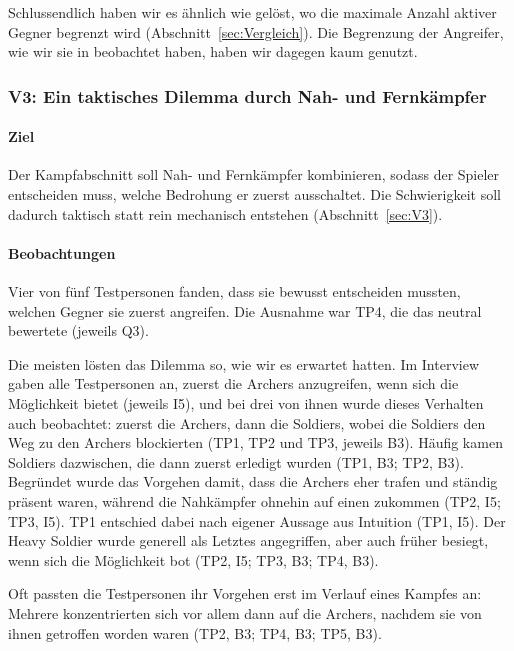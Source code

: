 \documentclass[../Main.tex]{subfiles}
\begin{document}
Schlussendlich haben wir es ähnlich wie  gelöst, wo die maximale Anzahl aktiver Gegner begrenzt wird (Abschnitt~\ref{sec:Vergleich}). Die Begrenzung der Angreifer, wie wir sie in  beobachtet haben, haben wir dagegen kaum genutzt.

\subsubsection{V3: Ein taktisches Dilemma durch Nah- und Fernkämpfer}

\paragraph{Ziel}
Der Kampfabschnitt soll Nah- und Fernkämpfer kombinieren, sodass der Spieler entscheiden muss, welche Bedrohung er zuerst ausschaltet. Die Schwierigkeit soll dadurch taktisch statt rein mechanisch entstehen (Abschnitt~\ref{sec:V3}).

\paragraph{Beobachtungen}
Vier von fünf Testpersonen fanden, dass sie bewusst entscheiden mussten, welchen Gegner sie zuerst angreifen. Die Ausnahme war TP4, die das neutral bewertete (jeweils Q3).

Die meisten lösten das Dilemma so, wie wir es erwartet hatten. Im Interview gaben alle Testpersonen an, zuerst die Archers anzugreifen, wenn sich die Möglichkeit bietet (jeweils I5), und bei drei von ihnen wurde dieses Verhalten auch beobachtet: zuerst die Archers, dann die Soldiers, wobei die Soldiers den Weg zu den Archers blockierten (TP1, TP2 und TP3, jeweils B3). Häufig kamen Soldiers dazwischen, die dann zuerst erledigt wurden (TP1, B3; TP2, B3). Begründet wurde das Vorgehen damit, dass die Archers eher trafen und ständig präsent waren, während die Nahkämpfer ohnehin auf einen zukommen (TP2, I5; TP3, I5). TP1 entschied dabei nach eigener Aussage aus Intuition (TP1, I5). Der Heavy Soldier wurde generell als Letztes angegriffen, aber auch früher besiegt, wenn sich die Möglichkeit bot (TP2, I5; TP3, B3; TP4, B3).

Oft passten die Testpersonen ihr Vorgehen erst im Verlauf eines Kampfes an: Mehrere konzentrierten sich vor allem dann auf die Archers, nachdem sie von ihnen getroffen worden waren (TP2, B3; TP4, B3; TP5, B3).
\end{document}
